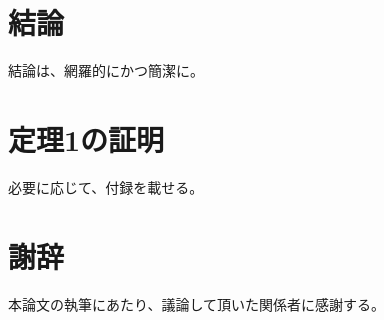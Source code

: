 \documentclass[11pt,oneside,openany,report]{jsbook}
\begin{document}

\chapter{結論}
結論は、網羅的にかつ簡潔に。


\appendix
\chapter{定理1の証明}
必要に応じて、付録を載せる。


\backmatter
\chapter{謝辞}
本論文の執筆にあたり、議論して頂いた関係者に感謝する。




\end{document}
